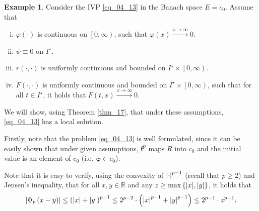 \documentclass[reqno]{amsart}
\numberwithin{equation}{section}
\theoremstyle{definition}
\newtheorem{example}{Example}
\theoremstyle{remark}
\newcommand{\br}[1]{\left(#1\right)}
\newcommand{\bvarphi}{\boldsymbol{\varphi}}
\newcommand{\cbr}[1]{\left\{#1\right\}}
\newcommand{\lsrbr}[1]{\left[#1\right)}
\newcommand{\R}{\mathbb{R}}
\newcommand{\sI}{I^{\star}}
\newcommand{\theoremRef}[1]{\textrm{Theorem \ref{#1}}}
\begin{document}
	\begin{example}\label{ex_01}
		Consider the IVP \eqref{eq_04_13} in the Banach space $E=c_0$. Assume that
		\begin{enumerate}[(i)]
			\item $\varphi\br{\cdot}$ is continuous on $\lsrbr{0,\infty}$, such that $\varphi\br{x}\xrightarrow{x\rightarrow\infty}0$.
			\item $\psi\equiv0$ on $\sI$.
			\item $r\br{\cdot,\cdot}$ is uniformly continuous and bounded on $\sI\times\lsrbr{0,\infty}$.\label{ex_01_ass_03}
			\item $F\br{\cdot,\cdot}$ is uniformly continuous and bounded on $\sI\times\lsrbr{0,\infty}$, such that for all $t\in\sI$, it holds that $F\br{t,x}\xrightarrow{x\rightarrow\infty}0$.
			\label{th_04_03_ass_04}
		\end{enumerate}
		We will show, using \theoremRef{thm_17}, that under these assumptions, \eqref{eq_04_13} has a local solution.
		
		Firstly, note that the problem \eqref{eq_04_13} is well formulated, since it can be easily shown that under given assumptions, $\mathbf{f}^p$ maps $R$ into $c_0$ and the initial value is an element of $c_0$ (i.e. $\bvarphi\in{c}_0$).
		
		Note that it is easy to verify, using the convexity of $\abs{\cdot}^{p-1}$ (recall that $p\geq2$) and Jensen's inequality, that for all $x,y\in\R$ and any $z\geq\max\cbr{\abs{x},\abs{y}}$, it holds that
		\begin{equation}\label{eq_04_14}
			\abs{\Phi_p\br{x-y}}\leq\br{\abs{x}+\abs{y}}^{p-1}\leq2^{p-2}\cdot\br{\abs{x}^{p-1}+\abs{y}^{p-1}}\leq2^{p-1}\cdot{z}^{p-1}.
		\end{equation}
		

\end{example}
\end{document}
